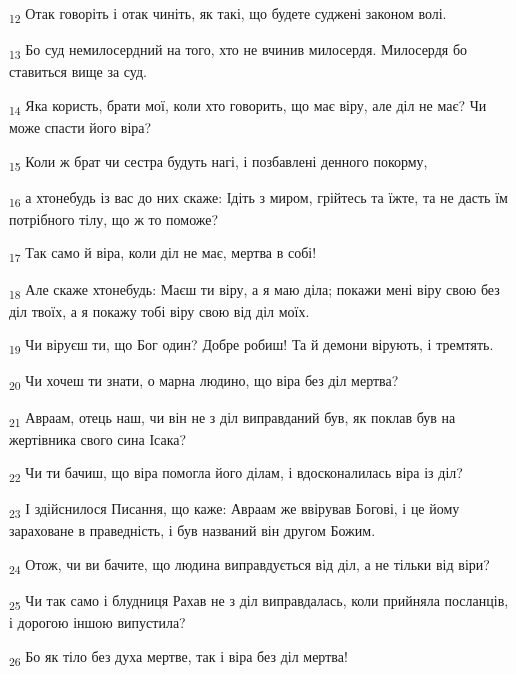 \begin{tcolorbox}
\textsubscript{12} Отак говоріть і отак чиніть, як такі, що будете суджені законом волі.
\end{tcolorbox}
\begin{tcolorbox}
\textsubscript{13} Бо суд немилосердний на того, хто не вчинив милосердя. Милосердя бо ставиться вище за суд.
\end{tcolorbox}
\begin{tcolorbox}
\textsubscript{14} Яка користь, брати мої, коли хто говорить, що має віру, але діл не має? Чи може спасти його віра?
\end{tcolorbox}
\begin{tcolorbox}
\textsubscript{15} Коли ж брат чи сестра будуть нагі, і позбавлені денного покорму,
\end{tcolorbox}
\begin{tcolorbox}
\textsubscript{16} а хтонебудь із вас до них скаже: Ідіть з миром, грійтесь та їжте, та не дасть їм потрібного тілу, що ж то поможе?
\end{tcolorbox}
\begin{tcolorbox}
\textsubscript{17} Так само й віра, коли діл не має, мертва в собі!
\end{tcolorbox}
\begin{tcolorbox}
\textsubscript{18} Але скаже хтонебудь: Маєш ти віру, а я маю діла; покажи мені віру свою без діл твоїх, а я покажу тобі віру свою від діл моїх.
\end{tcolorbox}
\begin{tcolorbox}
\textsubscript{19} Чи віруєш ти, що Бог один? Добре робиш! Та й демони вірують, і тремтять.
\end{tcolorbox}
\begin{tcolorbox}
\textsubscript{20} Чи хочеш ти знати, о марна людино, що віра без діл мертва?
\end{tcolorbox}
\begin{tcolorbox}
\textsubscript{21} Авраам, отець наш, чи він не з діл виправданий був, як поклав був на жертівника свого сина Ісака?
\end{tcolorbox}
\begin{tcolorbox}
\textsubscript{22} Чи ти бачиш, що віра помогла його ділам, і вдосконалилась віра із діл?
\end{tcolorbox}
\begin{tcolorbox}
\textsubscript{23} І здійснилося Писання, що каже: Авраам же ввірував Богові, і це йому зараховане в праведність, і був названий він другом Божим.
\end{tcolorbox}
\begin{tcolorbox}
\textsubscript{24} Отож, чи ви бачите, що людина виправдується від діл, а не тільки від віри?
\end{tcolorbox}
\begin{tcolorbox}
\textsubscript{25} Чи так само і блудниця Рахав не з діл виправдалась, коли прийняла посланців, і дорогою іншою випустила?
\end{tcolorbox}
\begin{tcolorbox}
\textsubscript{26} Бо як тіло без духа мертве, так і віра без діл мертва!
\end{tcolorbox}
